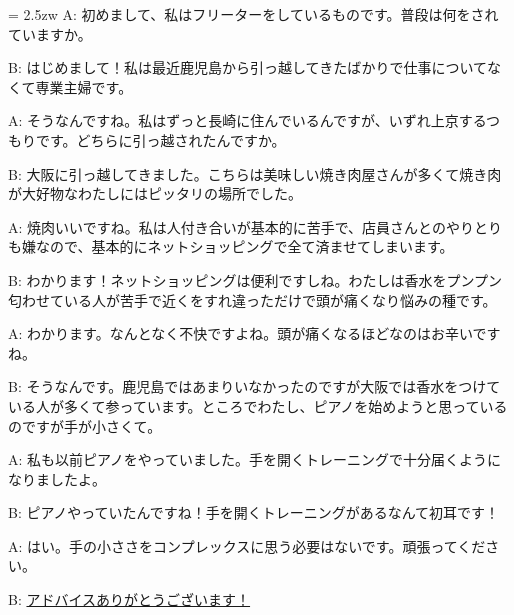 \documentclass[11pt]{amsart}
\title{}
\author{}
\newenvironment{hangall}[1]{\hangindent = 2.5zw\everypar{\hangindent = 2.5zw}}{}
\begin{document}
\maketitle
\begin{hangall}{}%
A: 初めまして、私はフリーターをしているものです。普段は何をされていますか。

B: はじめまして！私は最近鹿児島から引っ越してきたばかりで仕事についてなくて専業主婦です。

A: そうなんですね。私はずっと長崎に住んでいるんですが、いずれ上京するつもりです。どちらに引っ越されたんですか。

B: 大阪に引っ越してきました。こちらは美味しい焼き肉屋さんが多くて焼き肉が大好物なわたしにはピッタリの場所でした。

A: 焼肉いいですね。私は人付き合いが基本的に苦手で、店員さんとのやりとりも嫌なので、基本的にネットショッピングで全て済ませてしまいます。

B: わかります！ネットショッピングは便利ですしね。わたしは香水をプンプン匂わせている人が苦手で近くをすれ違っただけで頭が痛くなり悩みの種です。

A: わかります。なんとなく不快ですよね。頭が痛くなるほどなのはお辛いですね。

B: そうなんです。鹿児島ではあまりいなかったのですが大阪では香水をつけている人が多くて参っています。ところでわたし、ピアノを始めようと思っているのですが手が小さくて。

A: 私も以前ピアノをやっていました。手を開くトレーニングで十分届くようになりましたよ。

B: ピアノやっていたんですね！手を開くトレーニングがあるなんて初耳です！

A: はい。手の小ささをコンプレックスに思う必要はないです。頑張ってください。

B: \ul{アドバイスありがとうございます！}\end{hangall}
\end{document}

